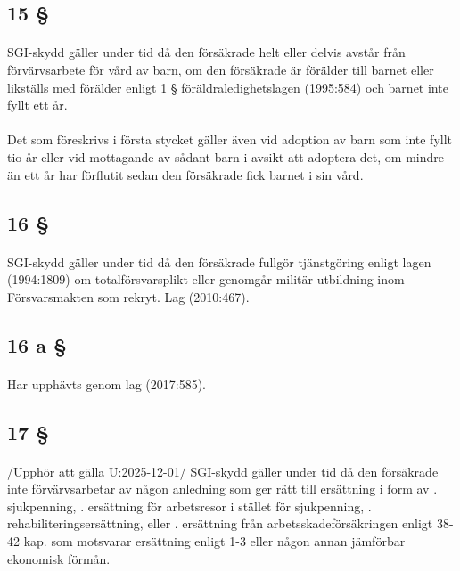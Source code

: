 \documentclass[a4paper,notitlepage,openany,10pt]{book}
\begin{document}
\subsection*{15 §}
\paragraph*{}
SGI-skydd gäller under tid då den försäkrade helt eller delvis avstår från förvärvsarbete för vård av barn, om den försäkrade är förälder till barnet eller likställs med förälder enligt 1 § föräldraledighetslagen (1995:584) och barnet inte fyllt ett år.
\paragraph*{}
Det som föreskrivs i första stycket gäller även vid adoption av barn som inte fyllt tio år eller vid mottagande av sådant barn i avsikt att adoptera det, om mindre än ett år har förflutit sedan den försäkrade fick barnet i sin vård.
\subsection*{16 §}
\paragraph*{}
SGI-skydd gäller under tid då den försäkrade fullgör tjänstgöring enligt lagen (1994:1809) om totalförsvarsplikt eller genomgår militär utbildning inom Försvarsmakten som rekryt.
Lag (2010:467).
\subsection*{16 a §}
\paragraph*{}
Har upphävts genom
lag (2017:585).
\subsection*{17 §}
\paragraph*{}
/Upphör att gälla U:2025-12-01/
SGI-skydd gäller under tid då den försäkrade inte förvärvsarbetar av någon anledning som ger rätt till ersättning i form av
. sjukpenning,
. ersättning för arbetsresor i stället för sjukpenning,
. rehabiliteringsersättning, eller
. ersättning från arbetsskadeförsäkringen enligt 38-42 kap. som motsvarar ersättning enligt 1-3 eller någon annan jämförbar ekonomisk förmån.
\end{document}
